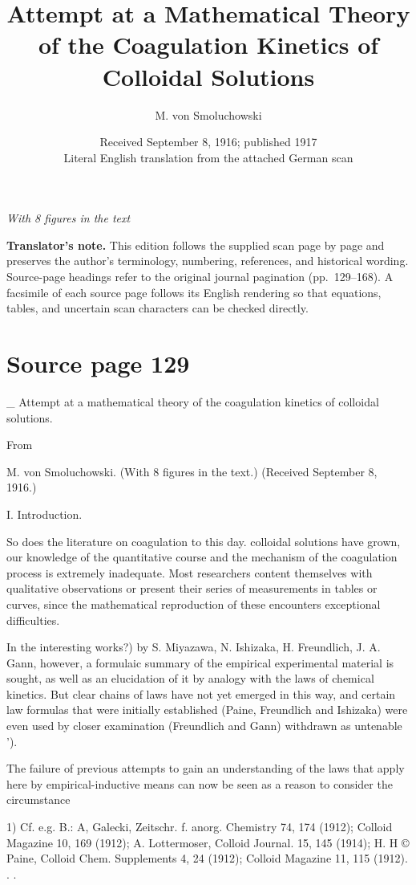 \documentclass[11pt]{article}
\title{Attempt at a Mathematical Theory of the Coagulation Kinetics of Colloidal Solutions}
\author{M. von Smoluchowski}
\date{Received September 8, 1916; published 1917\\[1ex]\small Literal English translation from the attached German scan}
\begin{document}
\maketitle
\begin{center}
\emph{With 8 figures in the text}
\end{center}
\noindent\textbf{Translator's note.} This edition follows the supplied scan page by page and preserves the author's terminology, numbering, references, and historical wording. Source-page headings refer to the original journal pagination (pp.~129--168). A facsimile of each source page follows its English rendering so that equations, tables, and uncertain scan characters can be checked directly.
\tableofcontents
\clearpage
\section*{Source page 129}
\_ Attempt at a mathematical theory of the coagulation kinetics of colloidal solutions.

From

M. von Smoluchowski. (With 8 figures in the text.) (Received September 8, 1916.)

I. Introduction.

So does the literature on coagulation to this day. colloidal solutions have grown, our knowledge of the quantitative course and the mechanism of the coagulation process is extremely inadequate. Most researchers content themselves with qualitative observations or present their series of measurements in tables or curves, since the mathematical reproduction of these encounters exceptional difficulties.

In the interesting works?) by S. Miyazawa, N. Ishizaka, H. Freundlich, J. A. Gann, however, a formulaic summary of the empirical experimental material is sought, as well as an elucidation of it by analogy with the laws of chemical kinetics. But clear chains of laws have not yet emerged in this way, and certain law formulas that were initially established (Paine, Freundlich and Ishizaka) were even used by closer examination (Freundlich and Gann) withdrawn as untenable ').

The failure of previous attempts to gain an understanding of the laws that apply here by empirical-inductive means can now be seen as a reason to consider the circumstance

1) Cf. e.g. B.: A, Galecki, Zeitschr. f. anorg. Chemistry 74, 174 (1912); Colloid Magazine 10, 169 (1912); A. Lottermoser, Colloid Journal. 15, 145 (1914); H. H © Paine, Colloid Chem. Supplements 4, 24 (1912); Colloid Magazine 11, 115 (1912). . .
\end{document}
